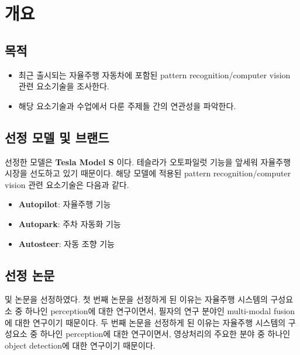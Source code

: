 \section{개요}{\label{sec:intro}}

\subsection{목적}
\begin{itemize}\tightlist
    \item 최근 출시되는 자율주행 자동차에 포함된 pattern recognition/computer vision 관련 요소기술을 조사한다.
    \item 해당 요소기술과 수업에서 다룬 주제들 간의 연관성을 파악한다.
\end{itemize}

\subsection{선정 모델 및 브랜드}
선정한 모델은 \textbf{Tesla Model S} 이다.
테슬라가 오토파일럿 기능을 앞세워 자율주행 시장을 선도하고 있기 때문이다.
해당 모델에 적용된 pattern recognition/computer vision 관련 요소기술은 다음과 같다.
\begin{itemize}\tightlist
    \item \textbf{Autopilot}: 자율주행 기능
    \item \textbf{Autopark}: 주차 자동화 기능
    \item \textbf{Autosteer}: 자동 조향 기능
\end{itemize}

\subsection{선정 논문}
\cite[Multi-modal fusion transformer for end-to-end autonomous driving]{Transfuser} 및 
\cite[YOLOv7: Trainable bag-of-freebies sets new state-of-the-art for real-time object detectors]{YOLOv7}
논문을 선정하였다.
첫 번째 논문을 선정하게 된 이유는 자율주행 시스템의 구성요소 중 하나인 perception에 대한 연구이면서,
필자의 연구 분야인 multi-modal fusion에 대한 연구이기 때문이다.
두 번째 논문을 선정하게 된 이유는 자율주행 시스템의 구성요소 중 하나인 perception에 대한 연구이면서,
영상처리의 주요한 분야 중 하나인 object detection에 대한 연구이기 때문이다.


